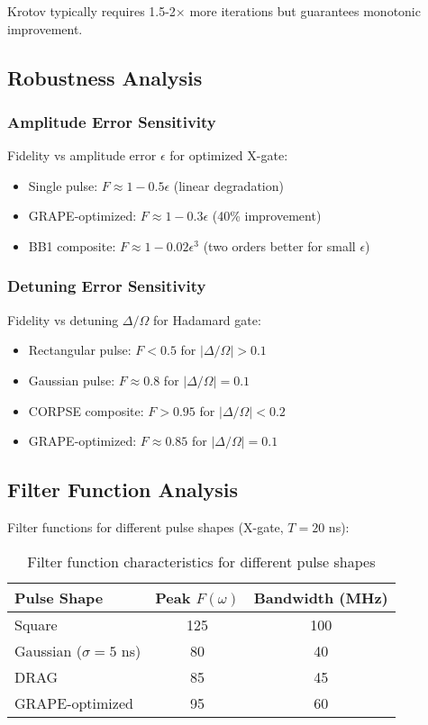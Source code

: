 \documentclass[11pt,a4paper]{article}
\theoremstyle{definition}
\theoremstyle{remark}
\begin{document}
Krotov typically requires 1.5-2× more iterations but guarantees monotonic improvement.

\subsection{Robustness Analysis}

\subsubsection{Amplitude Error Sensitivity}

Fidelity vs amplitude error $\epsilon$ for optimized X-gate:

\begin{itemize}
    \item Single pulse: $F \approx 1 - 0.5\epsilon$ (linear degradation)
    \item GRAPE-optimized: $F \approx 1 - 0.3\epsilon$ (40\% improvement)
    \item BB1 composite: $F \approx 1 - 0.02\epsilon^3$ (two orders better for small $\epsilon$)
\end{itemize}

\subsubsection{Detuning Error Sensitivity}

Fidelity vs detuning $\Delta/\Omega$ for Hadamard gate:

\begin{itemize}
    \item Rectangular pulse: $F < 0.5$ for $|\Delta/\Omega| > 0.1$
    \item Gaussian pulse: $F \approx 0.8$ for $|\Delta/\Omega| = 0.1$
    \item CORPSE composite: $F > 0.95$ for $|\Delta/\Omega| < 0.2$
    \item GRAPE-optimized: $F \approx 0.85$ for $|\Delta/\Omega| = 0.1$
\end{itemize}

\subsection{Filter Function Analysis}

Filter functions for different pulse shapes (X-gate, $T=20$ ns):

\begin{table}[h]
\centering
\begin{tabular}{lcc}
\toprule
\textbf{Pulse Shape} & \textbf{Peak $F(\omega)$} & \textbf{Bandwidth (MHz)} \\
\midrule
Square & 125 & 100 \\
Gaussian ($\sigma = 5$ ns) & 80 & 40 \\
DRAG & 85 & 45 \\
GRAPE-optimized & 95 & 60 \\
\bottomrule
\end{tabular}
\caption{Filter function characteristics for different pulse shapes}
\end{table}
\end{document}
